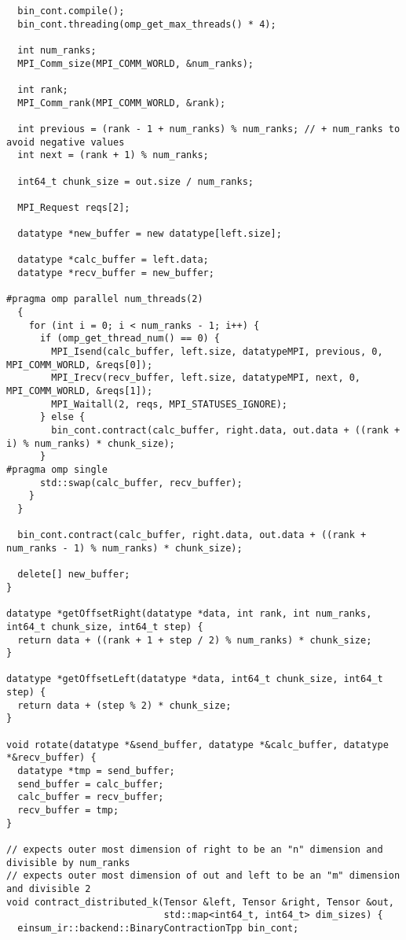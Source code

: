 {\begin{verbatim}
  bin_cont.compile();
  bin_cont.threading(omp_get_max_threads() * 4);

  int num_ranks;
  MPI_Comm_size(MPI_COMM_WORLD, &num_ranks);

  int rank;
  MPI_Comm_rank(MPI_COMM_WORLD, &rank);

  int previous = (rank - 1 + num_ranks) % num_ranks; // + num_ranks to avoid negative values
  int next = (rank + 1) % num_ranks;

  int64_t chunk_size = out.size / num_ranks;

  MPI_Request reqs[2];

  datatype *new_buffer = new datatype[left.size];

  datatype *calc_buffer = left.data;
  datatype *recv_buffer = new_buffer;

#pragma omp parallel num_threads(2)
  {
    for (int i = 0; i < num_ranks - 1; i++) {
      if (omp_get_thread_num() == 0) {
        MPI_Isend(calc_buffer, left.size, datatypeMPI, previous, 0, MPI_COMM_WORLD, &reqs[0]);
        MPI_Irecv(recv_buffer, left.size, datatypeMPI, next, 0, MPI_COMM_WORLD, &reqs[1]);
        MPI_Waitall(2, reqs, MPI_STATUSES_IGNORE);
      } else {
        bin_cont.contract(calc_buffer, right.data, out.data + ((rank + i) % num_ranks) * chunk_size);
      }
#pragma omp single
      std::swap(calc_buffer, recv_buffer);
    }
  }

  bin_cont.contract(calc_buffer, right.data, out.data + ((rank + num_ranks - 1) % num_ranks) * chunk_size);

  delete[] new_buffer;
}

datatype *getOffsetRight(datatype *data, int rank, int num_ranks, int64_t chunk_size, int64_t step) {
  return data + ((rank + 1 + step / 2) % num_ranks) * chunk_size;
}

datatype *getOffsetLeft(datatype *data, int64_t chunk_size, int64_t step) {
  return data + (step % 2) * chunk_size;
}

void rotate(datatype *&send_buffer, datatype *&calc_buffer, datatype *&recv_buffer) {
  datatype *tmp = send_buffer;
  send_buffer = calc_buffer;
  calc_buffer = recv_buffer;
  recv_buffer = tmp;
}

// expects outer most dimension of right to be an "n" dimension and divisible by num_ranks
// expects outer most dimension of out and left to be an "m" dimension and divisible 2
void contract_distributed_k(Tensor &left, Tensor &right, Tensor &out, 
                            std::map<int64_t, int64_t> dim_sizes) {
  einsum_ir::backend::BinaryContractionTpp bin_cont;


\end{verbatim}}
